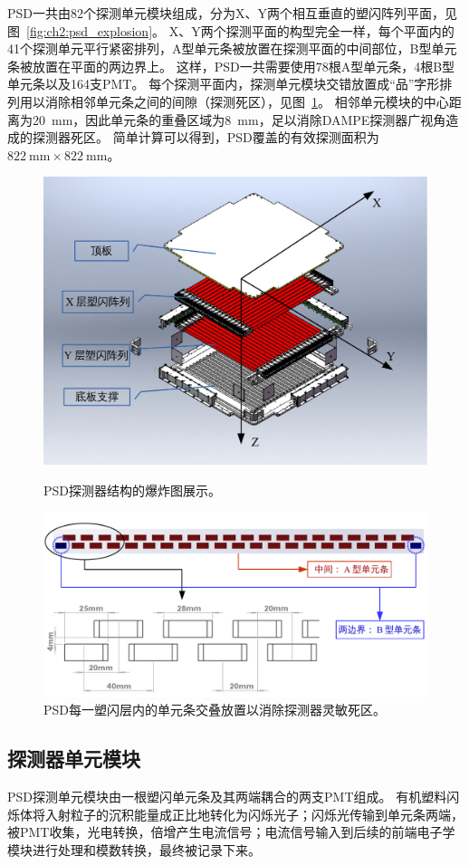 PSD一共由82个探测单元模块组成，分为X、Y两个相互垂直的塑闪阵列平面，见图~\ref{fig:ch2:psd_explosion}。
X、Y两个探测平面的构型完全一样，每个平面内的41个探测单元平行紧密排列，A型单元条被放置在探测平面的中间部位，B型单元条被放置在平面的两边界上。
这样，PSD一共需要使用78根A型单元条，4根B型单元条以及164支PMT。
每个探测平面内，探测单元模块交错放置成“品”字形排列用以消除相邻单元条之间的间隙（探测死区），见图~\ref{fig:ch2:bars_layout}。
相邻单元模块的中心距离为\SI{20}{\milli\meter}，因此单元条的重叠区域为\SI{8}{\milli\meter}，足以消除DAMPE探测器广视角造成的探测器死区。
简单计算可以得到，PSD覆盖的有效探测面积为$\SI{822}{\milli\meter}\times\SI{822}{\milli\meter}$。

\begin{figure}[t]
\centering
\includegraphics[width=0.72\linewidth]{chap/description/fig/psd_explosion}
\caption{PSD探测器结构的爆炸图展示。}
\label{fig:ch2:psd_explosion}

\centering
\includegraphics[width=0.8\linewidth]{chap/description/fig/bars_layout}
\caption{PSD每一塑闪层内的单元条交叠放置以消除探测器灵敏死区。}
\label{fig:ch2:bars_layout}
\end{figure}

\subsection{探测器单元模块}
PSD探测单元模块由一根塑闪单元条及其两端耦合的两支PMT组成。
有机塑料闪烁体将入射粒子的沉积能量成正比地转化为闪烁光子；闪烁光传输到单元条两端，被PMT收集，光电转换，倍增产生电流信号；电流信号输入到后续的前端电子学模块进行处理和模数转换，最终被记录下来。


